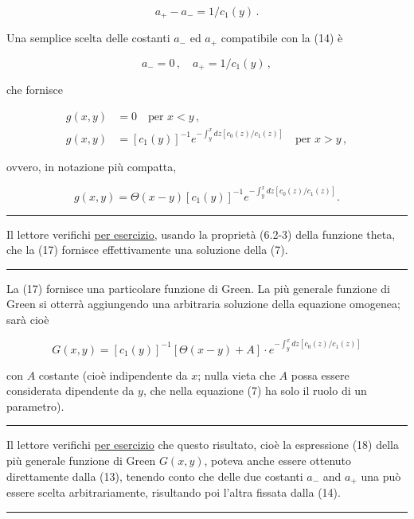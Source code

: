 \documentclass[11pt, a4paper]{book}
\numberwithin{equation}{section}
\begin{document}
\begin{equation}
    a_+ - a_- = 1/c_1(y) \,.
\end{equation}

Una semplice scelta delle costanti $a_-$ ed $a_+$ compatibile con la (14) è

\begin{equation}
    a_- = 0 \,, \quad a_+ = 1/c_1(y) \,,
\end{equation}

che fornisce

\begin{align}
    g(x,y) &= 0 \quad \text{per } x < y \,, \tag{16a} \\
    g(x,y) &= \left[ c_1(y) \right]^{-1} e^{\displaystyle -\int_{y}^{x} dz \left[ c_0(z)/c_1(z) \right]} \quad \text{per } x > y \,, \tag{16b}
\end{align}

ovvero, in notazione più compatta,

\begin{equation}
    g(x,y) = \Theta(x-y) \left[ c_1(y) \right]^{-1} e^{\displaystyle -\int_{y}^{x} dz \left[ c_0(z)/c_1(z) \right]}.
\end{equation}

\medskip
\noindent\rule{\textwidth}{0.4pt}
Il lettore verifichi \uline{per esercizio}, usando la proprietà (6.2-3) della funzione theta, che la (17) fornisce effettivamente una soluzione della (7).
\noindent\rule{\textwidth}{0.4pt}
\medskip

La (17) fornisce una particolare funzione di Green. La più generale funzione di Green si otterrà aggiungendo una arbitraria soluzione della equazione omogenea; sarà cioè

\begin{equation}
    G(x,y) = \left[ c_1(y) \right]^{-1} \left[ \Theta(x-y) + A \right]
    \cdot e^{\displaystyle -\int_{y}^{x} dz \left[ c_0(z)/c_1(z) \right]}
\end{equation}

con $A$ costante (cioè indipendente da $x$; nulla vieta che $A$ possa essere considerata dipendente da $y$, che nella equazione (7) ha solo il ruolo di un parametro).

\medskip
\noindent\rule{\textwidth}{0.4pt}
Il lettore verifichi \uline{per esercizio} che questo risultato, cioè la espressione (18) della più generale funzione di Green $G(x,y)$, poteva anche essere ottenuto direttamente dalla (13), tenendo conto che delle due costanti $a_-$ and $a_+$ una può essere scelta arbitrariamente, risultando poi l'altra fissata dalla (14).
\noindent\rule{\textwidth}{0.4pt}
\medskip
\end{document}
